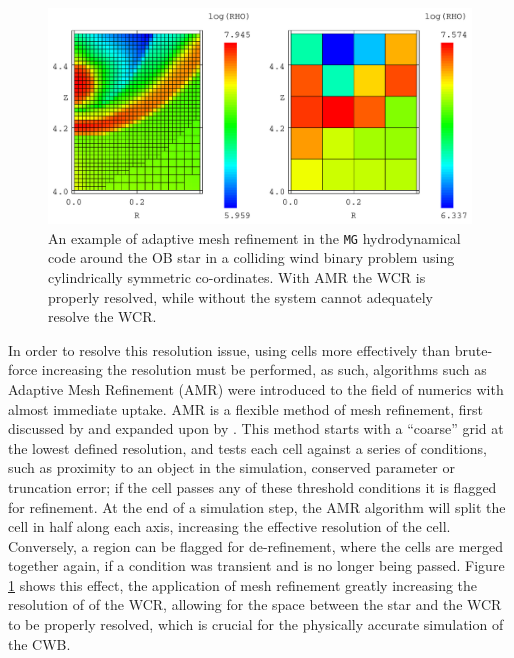
\begin{figure}
  \centering
  \includegraphics[width=5in]{assets/mergecellc.pdf}
  \caption[Adaptive mesh refinement comparison]{An example of adaptive mesh refinement in the \texttt{MG} hydrodynamical code around the OB star in a colliding wind binary problem using cylindrically symmetric co-ordinates. With AMR the WCR is properly resolved, while without the system cannot adequately resolve the WCR.}
  \label{fig:mgrefine}
\end{figure}

In order to resolve this resolution issue, using cells more effectively than brute-force increasing the resolution must be performed, as such, algorithms such as Adaptive Mesh Refinement (AMR) were introduced to the field of numerics with almost immediate uptake.
AMR is a flexible method of mesh refinement, first discussed by \textcite{bergerAdaptiveMeshRefinement1984} and expanded upon by \textcite{bergerLocalAdaptiveMesh1989}.
This method starts with a ``coarse'' grid at the lowest defined resolution, and tests each cell against a series of conditions, such as proximity to an object in the simulation, conserved parameter or truncation error; if the cell passes any of these threshold conditions it is flagged for refinement.
At the end of a simulation step, the AMR algorithm will split the cell in half along each axis, increasing the effective resolution of the cell.
Conversely, a region can be flagged for de-refinement, where the cells are merged together again, if a condition was transient and is no longer being passed.
Figure \ref{fig:mgrefine} shows this effect, the application of mesh refinement greatly increasing the resolution of of the WCR, allowing for the space between the star and the WCR to be properly resolved, which is crucial for the physically accurate simulation of the CWB.

